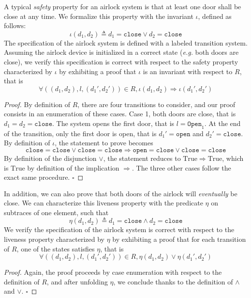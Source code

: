 \begin{example}
  A typical \emph{safety} property for an airlock system is that at least one
  door shall be close at any time.
  We formalize this property with the invariant \( \iota \), defined as follows:
  \[
    \iota( d_1, d_2) \triangleq d_1 = \mathtt{close} \vee d_2 = \mathtt{close}
  \]
  The specification of the airlock system is defined with a labeled transition
  system.
  Assuming the airlock device is initialized in a correct state (\emph{e.g.}
  both doors are close), we verify this specification is correct with respect to
  the safety property characterized by \( \iota \) by exhibiting a proof that
  \( \iota \) is an invariant with respect to \( R \), that is
  \[
    \forall ((d_1, d_2), l, (d_1', d_2')) \in R, \iota(d_1, d_2) \Rightarrow
    \iota(d_1', d_2')
  \]

  \begin{proof}
    By definition of \( R \), there are four transitions to consider, and our
    proof consists in an enumeration of these cases.
    Case 1, both doors are close, that is \( d_1 = d_2 = \mathtt{close} \).  The
    system opens the first door, that is \( l = \mathtt{Open}_1 \). At the end
    of the transition, only the first door is open, that is
    \( d_1' = \mathtt{open} \) and \( d_2' = \mathtt{close} \).
    By definition of \( \iota \), the statement to prove becomes
    \[
      \mathtt{close} = \mathtt{close} \vee \mathtt{close} = \mathtt{close}
      \Rightarrow \mathtt{open} = \mathtt{close} \vee \mathtt{close} =
      \mathtt{close}
    \]
    By definition of the disjunction \( \vee \), the statement reduces to
    \( \mathrm{True} \Rightarrow \mathrm{True} \), which is \( \mathrm{True} \)
    by definition of the implication \( \Rightarrow \).
    The three other cases follow the exact same procedure.
    \hfill \( \square \)
  \end{proof}

  In addition, we can also prove that both doors of the airlock will
  \emph{eventually} be close.
  We can characterize this liveness property with the predicate \( \eta \) on
  subtraces of one element, such that
  \[
    \eta(d_1, d_2) \triangleq d_1 = \mathtt{close} \wedge d_2 = \mathtt{close}
  \]
  We verify the specification of the airlock system is correct with respect to
  the liveness property characterized by \( \eta \) by exhibiting a proof that
  for each transition of \( R \), one of the states satisfies \( \eta \), that
  is
  \[
    \forall ((d_1, d_2), l, (d_1', d_2')) \in R, \eta(d_1, d_2) \vee \eta(d_1',
    d_2')
  \]

  \begin{proof}
    Again, the proof proceeds by case enumeration with respect to the definition
    of \( R \), and after unfolding \( \eta \), we conclude thanks to the
    definition of \( \wedge \) and \( \vee \).
    \hfill \( \square \)
  \end{proof}
\end{example}

